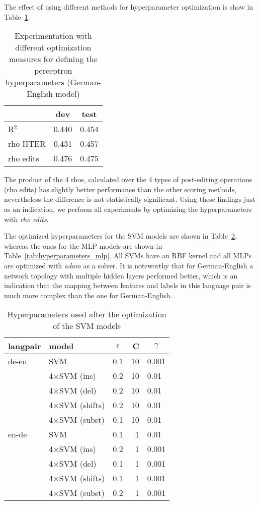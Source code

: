 \documentclass[11pt,letterpaper]{article}
\begin{document}
The effect of using different methods for hyperparameter optimization is show in
Table~\ref{tab:optimization}.

\begin{table}[ht]
\center
\begin{tabular}{lcc}
\toprule
			& \multicolumn{1}{c}{dev}	& \multicolumn{1}{c}{test} \\
\midrule
R$^2$ 		& 0.440 & 0.454 \\
rho HTER 	& 0.431 & 0.457  \\
rho edits	& 0.476 & 0.475 \\
\bottomrule
\end{tabular}
\caption{Experimentation with different optimization measures for defining the
perceptron hyperparameters (German-English model) }
\label{tab:optimization}
\end{table}

The product of the 4 rhos, calculated over the 4 types of post-editing
operations (rho edits) has slightly better performance than the other scoring
methods, nevertheless the difference is not statistically significant.
Using these findings just as an indication, we perform all experiments by
optimizing the hyperparameters with \emph{rho edits}.

The optimized hyperparameters for the SVM models are shown in
Table~\ref{tab:hyperparameters}, whereas the ones for the MLP models are shown
in Table~\ref{tab:hyperparameters_mlp}. All SVMs have an RBF kernel and all MLPs
are optimized with \emph{adam} as a solver. It is noteworthy that for German-English a network topology with
multiple hidden layers performed better, which is an indication that the mapping
between features and labels in this language pair is much more complex than the
one for German-English.

\begin{table}[ht]
\center
\begin{tabular}{llcrl}
\toprule
langpair	& model					& $\epsilon$	& C		&	\multicolumn{1}{c}{$\gamma$}	\\
\midrule 
de-en		& SVM					& 0.1			& 10	&	0.001		\\
			& 4$\times$SVM (ins)   & 0.2			& 10	&   0.01 		\\
			& 4$\times$SVM (del)   & 0.2			& 10	&   0.01 		\\
			& 4$\times$SVM (shifts)& 0.2			& 10		&   0.01 		\\
			& 4$\times$SVM (subst) & 0.1			& 10 	&   0.01 		\\
\midrule
en-de		& SVM			& 0.1			& 1		&	0.01		\\
			& 4$\times$SVM (ins)   & 0.2			& 1 	&   0.001 		\\
			& 4$\times$SVM (del)   & 0.1			& 1	    &   0.001 		\\
			& 4$\times$SVM (shifts)& 0.1			& 1		&   0.001 		\\
			& 4$\times$SVM (subst) & 0.2			& 1 	&   0.001 		\\
\bottomrule	
\end{tabular}
\caption{Hyperparameters used after the optimization of the SVM models}
\label{tab:hyperparameters}
\end{table}
\end{document}
